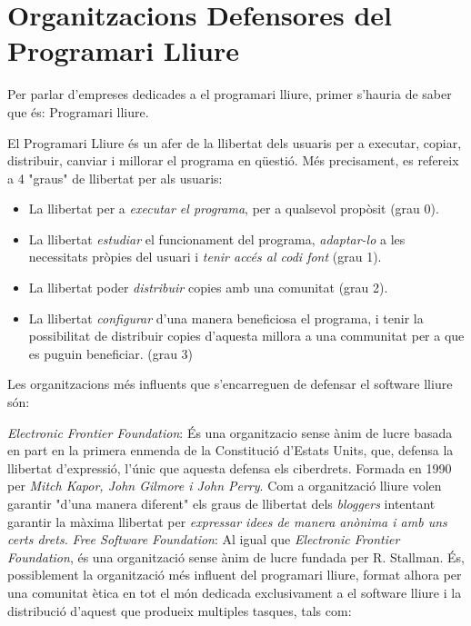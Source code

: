 \section{Organitzacions Defensores del Programari Lliure}

Per parlar d'empreses dedicades a el programari lliure, primer s'hauria de saber que és: Programari lliure.

El Programari Lliure és un afer de la llibertat dels usuaris per a executar, copiar, 		distribuir, canviar i millorar el programa en qüestió. Més precisament, es refereix a 4 "graus" de 		llibertat per als usuaris:

	\begin{itemize}
		\item La llibertat per a \textit{executar el programa}, per a qualsevol propòsit (grau  0).
		\item La llibertat \textit{estudiar} el funcionament del programa, \textit{adaptar-lo} a les 			necessitats pròpies del usuari i \textit{tenir accés al codi font} (grau 1).
		\item La llibertat poder \textit{distribuir} copies amb una comunitat (grau 2).
		\item La llibertat \textit{configurar} d'una manera beneficiosa el programa, i tenir la 		possibilitat de	distribuir copies d'aquesta millora a una communitat per a que es puguin 			beneficiar. (grau 3)
	\end{itemize}
Les organitzacions més influents que s'encarreguen de defensar el software lliure són:
 
	\emph{Electronic Frontier Foundation}: És una organitzacio sense ànim de lucre basada en part 		en la primera enmenda de la Constitució d'Estats Units, que, defensa la llibertat d'expressió, l'únic 		que aquesta defensa els ciberdrets. Formada en 1990 per \textit{Mitch Kapor, John Gilmore i John 		Perry}. Com a organització lliure volen garantir "d'una manera diferent" els graus de llibertat dels 		\emph{bloggers} intentant garantir la màxima llibertat per \textit{expressar idees de manera anònima i 		amb uns certs drets.}
	\emph{Free Software Foundation}: Al igual que \emph{Electronic Frontier Foundation}, és una 		organització sense ànim de lucre fundada per R. Stallman. És, possiblement la organització més 		influent del programari lliure, format alhora per una comunitat ètica en tot el món dedicada 		exclusivament a el software lliure i la distribució d'aquest que produeix multiples tasques, tals com:
		
